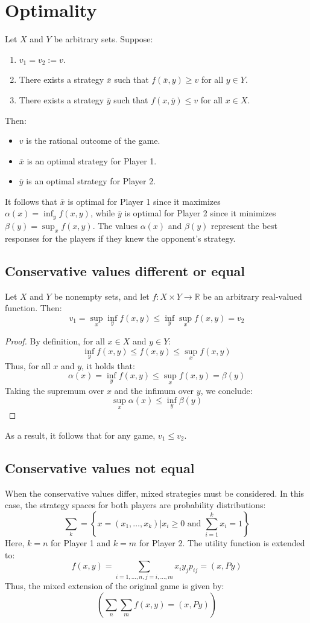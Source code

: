 \section{Optimality}

Let $X$ and $Y$ be arbitrary sets. 
Suppose:
\begin{enumerate}
    \item $v_1 = v_2 := v$.
    \item There exists a strategy $\bar{x}$ such that $f(\bar{x}, y) \geq v$ for all $y \in Y$.
    \item There exists a strategy $\bar{y}$ such that $f(x, \bar{y}) \leq v$ for all $x \in X$. 
\end{enumerate}
Then: 
\begin{itemize} 
    \item $v$ is the rational outcome of the game. 
    \item $\bar{x}$ is an optimal strategy for Player 1. 
    \item $\bar{y}$ is an optimal strategy for Player 2. 
\end{itemize}
It follows that $\bar{x}$ is optimal for Player 1 since it maximizes $\alpha(x) = \inf_y f(x, y)$, while $\bar{y}$ is optimal for Player 2 since it minimizes $\beta(y) = \sup_x f(x, y)$. 
The values $\alpha(x)$ and $\beta(y)$ represent the best responses for the players if they knew the opponent's strategy.

\subsection{Conservative values different or equal}
\begin{proposition}
    Let $X$ and $Y$ be nonempty sets, and let $f : X \times Y \rightarrow \mathbb{R}$ be an arbitrary real-valued function.
    Then: 
    \[v_1 = \sup_x\inf_yf (x, y) \leq \inf_y\sup_xf (x, y) = v_2\]
\end{proposition}
\begin{proof}
    By definition, for all $x \in X$ and $y \in Y$:
    \[\inf_yf(x, y) \leq f (x, y) \leq \sup_xf (x, y)\]
    Thus, for all $x$ and $y$, it holds that:
    \[\alpha(x) = \inf_yf (x, y) \leq \sup_xf (x, y) = \beta(y)\]
    Taking the supremum over $x$ and the infimum over $y$, we conclude:
    \[\sup_x\alpha(x) \leq \inf_y\beta(y)\]
\end{proof}
As a result, it follows that for any game, $v_1 \leq v_2$.

\subsection{Conservative values not equal}
When the conservative values differ, mixed strategies must be considered. 
In this case, the strategy spaces for both players are probability distributions:
\[\sum_k=\left\{x=(x_1,\dots,x_k)|x_i\geq 0 \text{ and }\sum_{i=1}^{k}x_i=1\right\}\]
Here, $k = n$ for Player 1 and $k = m$ for Player 2. 
The utility function is extended to:
\[f(x,y)=\sum_{i=1,\dots,n,j=i,\dots,m}x_iy_jp_{ij}=(x,Py)\]
Thus, the mixed extension of the original game is given by:
\[\left(\sum_n \sum_m f (x, y) = (x, Py)\right)\]

